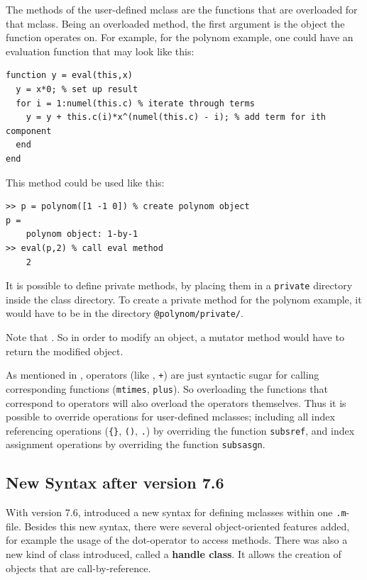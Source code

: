 The methods of the user-defined mclass are the functions that are overloaded for that mclass.
Being an overloaded method, the first argument is the object the function operates on.
For example, for the polynom example, one could have an evaluation function that may look like this:

\begin{lstlisting}
function y = eval(this,x)
  y = x*0; % set up result
  for i = 1:numel(this.c) % iterate through terms
    y = y + this.c(i)*x^(numel(this.c) - i); % add term for ith component
  end
end
\end{lstlisting}

This method could be used like this:

\begin{lstlisting}
>> p = polynom([1 -1 0]) % create polynom object
p = 
    polynom object: 1-by-1
>> eval(p,2) % call eval method
    2
\end{lstlisting}

It is possible to define private methods, by placing them in a {\tt private} directory inside
the class directory. To create a private method for the polynom example, it would have to be
in the directory {\tt @polynom/private/}.

Note that \matlab {}.
 So in order to modify an object, a mutator method would have to return the modified object.

As mentioned in , \matlab operators (like {\tt *}, {\tt +}) are just
syntactic sugar for calling corresponding functions ({\tt mtimes}, {\tt plus}). So overloading
the functions that correspond to operators will also overload the operators themselves. Thus it is
possible to override operations for user-defined mclasses; including all index referencing operations
({\tt \{\}}, {\tt ()}, {\tt .}) by overriding the function {\tt subsref}, and 
index assignment operations by overriding the function {\tt subsasgn}.

\subsection{New Syntax after version 7.6}
\label{sec:newClasses}

With version 7.6, \matlab introduced a new syntax for defining mclasses within one {\tt .m}-file.
Besides this new syntax, there were several object-oriented features added,
for example the usage of the dot-operator to access methods.
There was also a new kind of \matlab class introduced, called a \textbf{handle class}. 
It allows the creation of objects that are call-by-reference.

